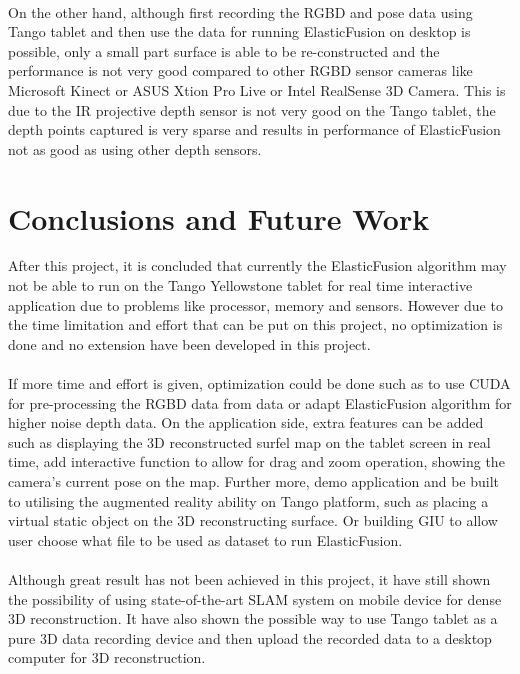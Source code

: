 \documentclass[12pt,twoside]{article}
\begin{document}
\\
On the other hand, although first recording the RGBD and pose data using Tango tablet and then use the data for running ElasticFusion on desktop is possible, only a small part surface is able to be re-constructed and the performance is not very good compared to other RGBD sensor cameras like Microsoft Kinect or ASUS Xtion Pro Live or Intel RealSense 3D Camera. This is due to the IR projective depth sensor is not very good on the Tango tablet, the depth points captured is very sparse and results in performance of ElasticFusion not as good as using other depth sensors.\\



\newpage




\section{Conclusions and Future Work}
After this project, it is concluded that currently the ElasticFusion algorithm may not be able to run on the Tango Yellowstone tablet for real time interactive application due to problems like processor, memory and sensors. However due to the time limitation and effort that can be put on this project, no optimization is done and no extension have been developed in this project. \\
\\
If more time and effort is given, optimization could be done such as to use CUDA for pre-processing the RGBD data from data or adapt ElasticFusion algorithm for higher noise depth data. On the application side, extra features can be added such as displaying the 3D reconstructed surfel map on the tablet screen in real time, add interactive function to allow for drag and zoom operation, showing the camera's current pose on the map. Further more, demo application and be built to utilising the augmented reality ability on Tango platform, such as placing a virtual static object on the 3D reconstructing surface. Or building GIU to allow user choose what file to be used as dataset to run ElasticFusion.\\
\\
Although great result has not been achieved in this project, it have still shown the possibility of using state-of-the-art SLAM system on mobile device for dense 3D reconstruction. It have also shown the possible way to use Tango tablet as a pure 3D data recording device and then upload the recorded data to a desktop computer for 3D reconstruction.\\
\end{document}
